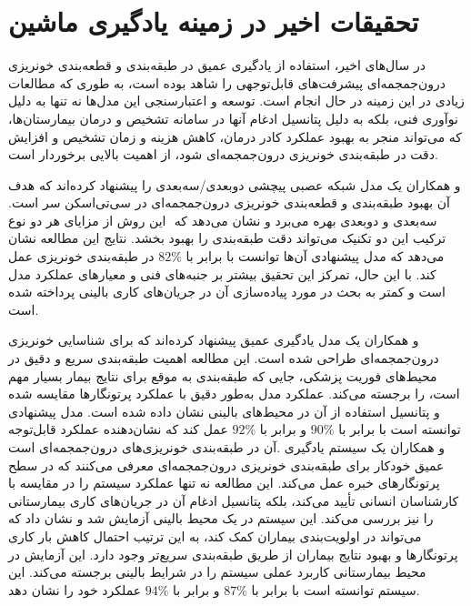 \section{تحقیقات اخیر در زمینه یادگیری ماشین}

در سال‌های اخیر، استفاده از یادگیری عمیق در طبقه‌بندی و قطعه‌بندی خونریزی درون‌جمجمه‌ای پیشرفت‌های قابل‌توجهی را شاهد بوده است، به طوری که مطالعات زیادی در این زمینه در حال انجام است. توسعه و اعتبارسنجی این مدل‌ها نه تنها به دلیل نوآوری فنی، بلکه به دلیل پتانسیل ادغام آنها در سامانه تشخیص و درمان بیمارستان‌ها، که می‌تواند منجر به بهبود عملکرد کادر درمان، کاهش هزینه و زمان تشخیص و افزایش دقت در طبقه‌بندی خونریزی درون‌جمجمه‌ای شود، از اهمیت بالایی برخوردار است.

و همکاران یک مدل شبکه عصبی پیچشی
 دوبعدی/سه‌بعدی را پیشنهاد کرده‌اند که هدف آن بهبود طبقه‌بندی و قطعه‌بندی خونریزی درون‌‌جمجمه‌ای در سی‌تی‌اسکن سر است. این روش از مزایای هر دو نوع
  ‎ سه‌بعدی و دو‌بعدی بهره می‌برد و نشان می‌دهد که ترکیب این دو تکنیک می‌تواند دقت طبقه‌بندی را بهبود بخشد. نتایج این مطالعه نشان می‌دهد که مدل پیشنهادی آن‌ها توانست با  
  برابر با
  \(82\%\)
  در طبقه‌بندی خونریزی عمل کند. با این حال، تمرکز این تحقیق بیشتر بر جنبه‌های فنی و معیارهای عملکرد مدل است و کمتر به بحث در مورد پیاده‌سازی آن در جریان‌های کاری بالینی پرداخته شده است\cite{chang2018hybrid}.

 و همکاران یک مدل یادگیری عمیق پیشنهاد کرده‌اند که برای شناسایی خونریزی درون‌جمجمه‌ای طراحی شده است. این مطالعه اهمیت طبقه‌بندی سریع و دقیق در محیط‌های فوریت پزشکی، جایی که طبقه‌بندی به موقع برای نتایج بیمار بسیار مهم است، را برجسته می‌کند. عملکرد مدل به‌طور دقیق با عملکرد پرتونگار‌ها مقایسه شده و پتانسیل استفاده از آن در محیط‌های بالینی نشان داده شده است. مدل پیشنهادی توانسته است با
 برابر با 
 \(90\%\)
 و 
  برابر با 
 \(92\%\)
 عمل کند که نشان‌دهنده عملکرد قابل‌توجه آن در طبقه‌بندی خونریزی‌های درون‌جمجمه‌ای است‎\cite{chilamkurthy2018deep}.
  و همکاران یک سیستم یادگیری عمیق خودکار برای طبقه‌بندی خونریزی درون‌جمجمه‌ای معرفی می‌کنند که در سطح پرتونگار‌های خبره عمل می‌کند. این مطالعه نه تنها عملکرد سیستم را در مقایسه با کارشناسان انسانی تأیید می‌کند، بلکه پتانسیل ادغام آن در جریان‌های کاری بیمارستانی را نیز بررسی می‌کند. این سیستم در یک محیط بالینی آزمایش شد و نشان داد که می‌تواند در اولویت‌بندی بیماران کمک کند، به این ترتیب احتمال کاهش بار کاری پرتونگار‌ها و بهبود نتایج بیماران از طریق طبقه‌بندی سریع‌تر وجود دارد. این آزمایش در محیط بیمارستانی کاربرد عملی سیستم را در شرایط بالینی برجسته می‌کند. این سیستم توانسته است با 
 برابر با 
 \(87\%\)
 و 
 برابر با 
 \(94\%\)
 عملکرد خود را نشان دهد‎\cite{titano2018automated}.

